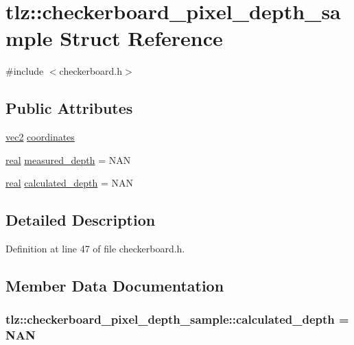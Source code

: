 \hypertarget{structtlz_1_1checkerboard__pixel__depth__sample}{}\section{tlz\+:\+:checkerboard\+\_\+pixel\+\_\+depth\+\_\+sample Struct Reference}
\label{structtlz_1_1checkerboard__pixel__depth__sample}


{\ttfamily \#include $<$checkerboard.\+h$>$}

\subsection*{Public Attributes}
\begin{DoxyCompactItemize}
\item 
\hyperlink{namespacetlz_ae192989bfbe6c700ac84d2a8cf05ebb4}{vec2} \hyperlink{structtlz_1_1checkerboard__pixel__depth__sample_ae75dff6faf6e8813249ebeebd43c51f1}{coordinates}
\item 
\hyperlink{namespacetlz_a15fd37cce97f2b8b606af18c2615f602}{real} \hyperlink{structtlz_1_1checkerboard__pixel__depth__sample_ae245311103eb6c20f302098943c8c9c5}{measured\+\_\+depth} = N\+AN
\item 
\hyperlink{namespacetlz_a15fd37cce97f2b8b606af18c2615f602}{real} \hyperlink{structtlz_1_1checkerboard__pixel__depth__sample_ab03d53bb5a02c6923087cde16c78817f}{calculated\+\_\+depth} = N\+AN
\end{DoxyCompactItemize}


\subsection{Detailed Description}


Definition at line 47 of file checkerboard.\+h.



\subsection{Member Data Documentation}
\subsubsection[{\texorpdfstring{calculated\+\_\+depth}{calculated_depth}}]{ tlz\+::checkerboard\+\_\+pixel\+\_\+depth\+\_\+sample\+::calculated\+\_\+depth = N\+AN}\hypertarget{structtlz_1_1checkerboard__pixel__depth__sample_ab03d53bb5a02c6923087cde16c78817f}{}\label{structtlz_1_1checkerboard__pixel__depth__sample_ab03d53bb5a02c6923087cde16c78817f}



